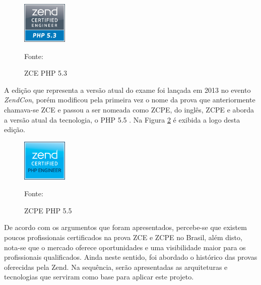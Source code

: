 \begin{figure}[h!tb]
	\caption{ZCE PHP 5.3}
	\label{fig:logoCertificationPHP53}

	\centering
	\includegraphics[width=0.19\textwidth]{images/logo/php5-3.png}

	\centering
	\footnotesize Fonte: 
\end{figure}

\FloatBarrier 	%

A edição que representa a versão atual do exame foi lançada em 2013 no evento
\textit{ZendCon}, porém modificou pela primeira vez o nome da prova que
anteriormente chamava-se \acs{ZCE} e passou a ser nomeada como \acs{ZCPE}, do
inglês, \acl{ZCPE} e aborda a versão atual da tecnologia, o PHP 5.5 
\cite{entrevistaAriZCEBrasil}. Na Figura \ref{fig:logoCertificationPHP55} é 
exibida a logo desta edição.

\begin{figure}[h!tb]
	\caption{ZCPE PHP 5.5}
	\label{fig:logoCertificationPHP55}

	\centering
	\includegraphics[width=0.19\textwidth]{images/logo/php5-5.png}

	\centering
	\footnotesize Fonte: 
\end{figure}

\FloatBarrier 	%

De acordo com os argumentos que foram apresentados, percebe-se que existem
poucos profissionais certificados na prova \acs{ZCE} e \acs{ZCPE} no Brasil,
além disto, nota-se que o mercado oferece oportunidades e uma visibilidade maior
para os profissionais qualificados. Ainda neste sentido, foi abordado o histórico das
provas oferecidas pela \acs{Zend}. Na sequência, serão apresentadas as
arquiteturas e tecnologias que serviram como base para aplicar este projeto.
